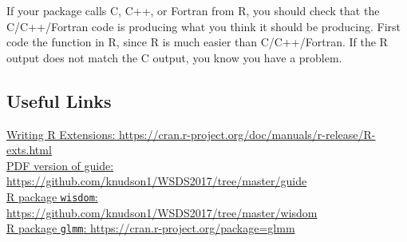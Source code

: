 \documentclass{article}
\begin{document}
If your package calls C, C++, or Fortran from R, you should check that the C/C++/Fortran code is producing what you think it should be producing. First code the function in R, since R is much easier than C/C++/Fortran. If the R output does not match the C output, you know you have a problem.

\subsection{Useful Links}
\noindent \href{https://cran.r-project.org/doc/manuals/r-release/R-exts.html}{Writing R Extensions: \url{https://cran.r-project.org/doc/manuals/r-release/R-exts.html}}\\

\noindent \href{https://github.com/knudson1/WSDS2017/tree/master/guide}{PDF version of guide: \url{https://github.com/knudson1/WSDS2017/tree/master/guide}}\\

\noindent \href{https://github.com/knudson1/WSDS2017/tree/master/wisdom}{ R package \texttt{wisdom}: \url{https://github.com/knudson1/WSDS2017/tree/master/wisdom}}\\

\noindent \href{https://cran.r-project.org/package=glmm}{ R package \texttt{glmm}: \url{https://cran.r-project.org/package=glmm} }
\end{document}
